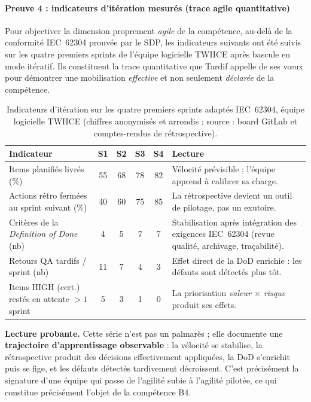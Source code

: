 \paragraph{Preuve 4 : indicateurs d'itération mesurés (trace agile quantitative)}

Pour objectiver la dimension proprement \emph{agile} de la compétence, au-delà de la conformité IEC~62304 prouvée par le SDP, les indicateurs suivants ont été suivis sur les quatre premiers sprints de l'équipe logicielle TWIICE après bascule en mode itératif. Ils constituent la trace quantitative que Tardif appelle de ses vœux pour démontrer une mobilisation \emph{effective} et non seulement \emph{déclarée} de la compétence.

\begin{table}[h!]
  \centering\small
  \begin{tabularx}{\textwidth}{@{} l c c c c X @{}}
    \toprule
    \textbf{Indicateur} & \textbf{S1} & \textbf{S2} & \textbf{S3} & \textbf{S4} & \textbf{Lecture} \\
    \midrule
    Items planifiés livrés (\%)
      & 55 & 68 & 78 & 82
      & Vélocité prévisible ; l'équipe apprend à calibrer sa charge. \\
    Actions rétro fermées au sprint suivant (\%)
      & 40 & 60 & 75 & 85
      & La rétrospective devient un outil de pilotage, pas un exutoire. \\
    Critères de la \textit{Definition of Done} (nb)
      & 4 & 5 & 7 & 7
      & Stabilisation après intégration des exigences IEC~62304 (revue qualité, archivage, traçabilité). \\
    Retours QA tardifs / sprint (nb)
      & 11 & 7 & 4 & 3
      & Effet direct de la DoD enrichie : les défauts sont détectés plus tôt. \\
    Items HIGH (cert.) restés en attente $>1$ sprint
      & 5 & 3 & 1 & 0
      & La priorisation \emph{valeur $\times$ risque} produit ses effets. \\
    \bottomrule
  \end{tabularx}
  \caption{Indicateurs d'itération sur les quatre premiers sprints adaptés IEC~62304, équipe logicielle TWIICE (chiffres anonymisés et arrondis ; source : board GitLab et comptes-rendus de rétrospective).}
  \label{tab:b4-indicateurs-iteration}
\end{table}

\textbf{Lecture probante.} Cette série n'est pas un palmarès ; elle documente une \textbf{trajectoire d'apprentissage observable} : la vélocité se stabilise, la rétrospective produit des décisions effectivement appliquées, la DoD s'enrichit puis se fige, et les défauts détectés tardivement décroissent. C'est précisément la signature d'une équipe qui passe de l'agilité subie à l'agilité pilotée, ce qui constitue précisément l'objet de la compétence B4.

